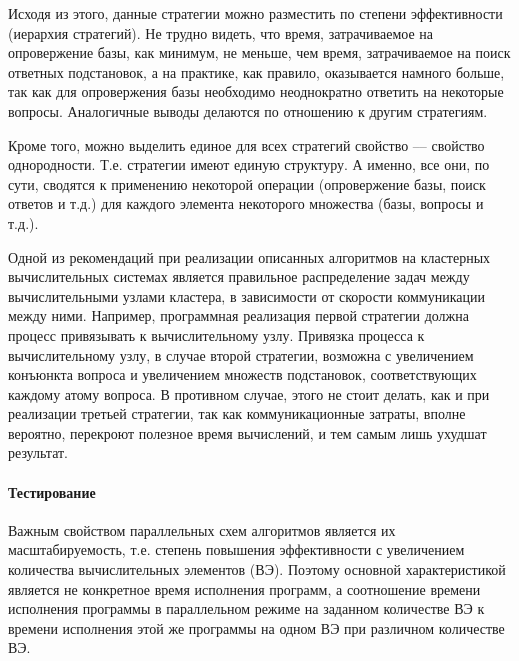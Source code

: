 Исходя из этого, данные стратегии можно разместить по степени эффективности (иерархия стратегий). Не трудно видеть, что время, затрачиваемое на опровержение базы, как минимум, не меньше, чем время, затрачиваемое на поиск ответных подстановок, а на практике, как правило, оказывается намного больше, так как для опровержения базы необходимо неоднократно ответить на некоторые вопросы. Аналогичные выводы делаются по отношению к другим стратегиям.

Кроме того, можно выделить единое для всех стратегий свойство –-- свойство однородности. Т.е. стратегии имеют единую структуру. А именно, все они, по сути, сводятся к применению некоторой операции (опровержение базы, поиск ответов и т.д.) для каждого элемента некоторого множества (базы, вопросы и т.д.).

Одной из рекомендаций при реализации описанных алгоритмов на кластерных вычислительных системах является правильное распределение задач между вычислительными узлами кластера, в зависимости от скорости коммуникации между ними. Например, программная реализация первой стратегии должна процесс привязывать к вычислительному узлу. Привязка процесса к вычислительному узлу, в случае второй стратегии, возможна с увеличением конъюнкта вопроса и увеличением множеств подстановок, соответствующих каждому атому вопроса. В противном случае, этого не стоит делать, как и  при реализации третьей стратегии, так как коммуникационные затраты, вполне вероятно, перекроют полезное время вычислений, и тем самым лишь ухудшат результат.


\paragraph{Тестирование}
Важным свойством параллельных схем алгоритмов является их масштабируемость, т.е. степень повышения эффективности с увеличением количества вычислительных элементов (ВЭ). Поэтому основной характеристикой является не конкретное время исполнения программ, а соотношение времени исполнения программы в параллельном режиме на заданном количестве ВЭ к времени исполнения этой же программы на одном ВЭ при различном количестве ВЭ.

